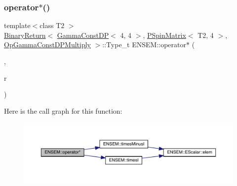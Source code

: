 \subsubsection{\texorpdfstring{operator$\ast$()}{operator*()}\hspace{0.1cm}{\footnotesize\ttfamily [37/64]}}
{\footnotesize\ttfamily template$<$class T2 $>$ \\
\mbox{\hyperlink{structENSEM_1_1BinaryReturn}{Binary\+Return}}$<$ \mbox{\hyperlink{classENSEM_1_1GammaConstDP}{Gamma\+Const\+DP}}$<$ 4, 4 $>$, \mbox{\hyperlink{classENSEM_1_1PSpinMatrix}{P\+Spin\+Matrix}}$<$ T2, 4 $>$, \mbox{\hyperlink{structENSEM_1_1OpGammaConstDPMultiply}{Op\+Gamma\+Const\+D\+P\+Multiply}} $>$\+::Type\+\_\+t E\+N\+S\+E\+M\+::operator$\ast$ (\begin{DoxyParamCaption}\item[{const \mbox{\hyperlink{classENSEM_1_1GammaConstDP}{Gamma\+Const\+DP}}$<$ 4, 4 $>$ \&}]{,  }\item[{const \mbox{\hyperlink{classENSEM_1_1PSpinMatrix}{P\+Spin\+Matrix}}$<$ T2, 4 $>$ \&}]{r }\end{DoxyParamCaption})\hspace{0.3cm}{\ttfamily [inline]}}

Here is the call graph for this function\+:\nopagebreak
\begin{figure}[H]
\begin{center}
\leavevmode
\includegraphics[width=350pt]{d6/df5/group__primspinmatrix_ga5399e919ac66849bae0231bd88b07167_cgraph}
\end{center}
\end{figure}
\mbox{\label{group__primspinmatrix_ga236159edb8e3e69f1a1813261364b3b3}} 

